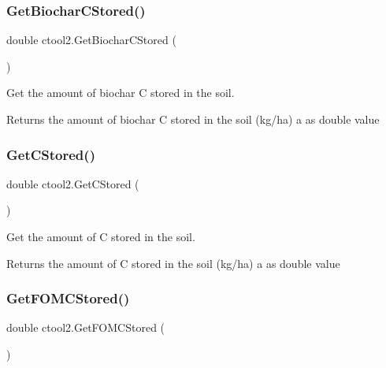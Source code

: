 \subsubsection{\texorpdfstring{GetBiocharCStored()}{GetBiocharCStored()}}
{\footnotesize\ttfamily double ctool2.\+Get\+Biochar\+C\+Stored (\begin{DoxyParamCaption}{ }\end{DoxyParamCaption})\hspace{0.3cm}{\ttfamily [inline]}}



Get the amount of biochar C stored in the soil. 

\begin{DoxyReturn}{Returns}
the amount of biochar C stored in the soil (kg/ha) a as double value 
\end{DoxyReturn}
\mbox{\label{classctool2_a4002bf436d8ceb479203d186315a66e9}} 
\subsubsection{\texorpdfstring{GetCStored()}{GetCStored()}}
{\footnotesize\ttfamily double ctool2.\+Get\+C\+Stored (\begin{DoxyParamCaption}{ }\end{DoxyParamCaption})\hspace{0.3cm}{\ttfamily [inline]}}



Get the amount of C stored in the soil. 

\begin{DoxyReturn}{Returns}
the amount of C stored in the soil (kg/ha) a as double value 
\end{DoxyReturn}
\mbox{\label{classctool2_a64472639343da0e7e753a2b5f169468e}} 
\subsubsection{\texorpdfstring{GetFOMCStored()}{GetFOMCStored()}}
{\footnotesize\ttfamily double ctool2.\+Get\+F\+O\+M\+C\+Stored (\begin{DoxyParamCaption}{ }\end{DoxyParamCaption})\hspace{0.3cm}{\ttfamily [inline]}}




